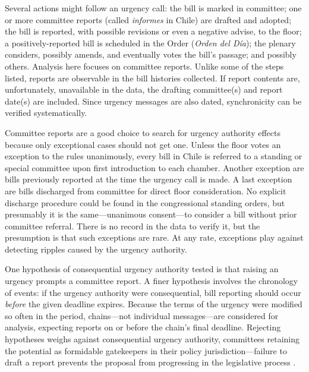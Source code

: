 \documentclass[letter,12pt]{article}
\begin{document}
Several actions might follow an urgency call: the bill is marked in committee; one or more committee reports (called \emph{informes} in Chile) are drafted and adopted; the bill is reported, with possible revisions or even a negative advise, to the floor; a positively-reported bill is scheduled in the Order (\emph{Orden del D\'ia}); the plenary considers, possibly amends, and eventually votes the bill's passage; and possibly others. Analysis here focuses on committee reports. Unlike some of the steps listed, reports are observable in the bill histories collected. If report contents are, unfortunately, unavailable in the data, the drafting committee(s) and report date(s) are included. Since urgency messages are also dated, synchronicity can be verified systematically.  

Committee reports are a good choice to search for urgency authority effects because only exceptional cases should not get one. Unless the floor votes an exception to the rules unanimously, every bill in Chile is referred to a standing or special committee upon first introduction to each chamber. Another exception are bills previously reported at the time the urgency call is made. A last exception are bills discharged from committee for direct floor consideration. No explicit discharge procedure could be found in the congressional standing orders, but presumably it is the same---unanimous consent---to consider a bill without prior committee referral. There is no record in the data to verify it, but the presumption is that such exceptions are rare. At any rate, exceptions play against detecting ripples caused by the urgency authority.

One hypothesis of consequential urgency authority tested is that raising an urgency prompts a committee report. A finer hypothesis involves the chronology of events: if the urgency authority were consequential, bill reporting should occur \emph{before} the given deadline expires. Because the terms of the urgency were modified so often in the period, chains---not individual messages---are considered for analysis, expecting reports on or before the chain's final deadline. Rejecting hypotheses weighs against consequential urgency authority, committees retaining the potential as formidable gatekeepers in their policy jurisdiction---failure to draft a report prevents the proposal from progressing in the legislative process \citep{cox.mccubbins.1993,fenno.1973,shepsle.weingast.1987}. 

\end{document}
